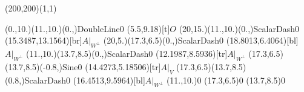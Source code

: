 \unitlength=1bp%

\begin{feynartspicture}(200,200)(1,1)

\FADiagram{}
\FAProp(0.,10.)(11.,10.)(0.,){DoubleLine}{0}
\FALabel(5.5,9.18)[t]{$O$}
\FAProp(20,15.)(11.,10.)(0.,){ScalarDash}{0}
\FALabel(15.3487,13.1564)[br]{$A|_{W^\perp}$}
\FAProp(20,5.)(17.3,6.5)(0.,){ScalarDash}{0}
\FALabel(18.8013,6.4064)[bl]{$A|_{W^\perp}$}
\FAProp(11.,10.)(13.7,8.5)(0.,){ScalarDash}{0}
\FALabel(12.1987,8.5936)[tr]{$A|_{W^\perp}$}
\FAProp(17.3,6.5)(13.7,8.5)(-0.8,){Sine}{0}
\FALabel(14.4273,5.18506)[tr]{$A|_V$}
\FAProp(17.3,6.5)(13.7,8.5)(0.8,){ScalarDash}{0}
\FALabel(16.4513,9.5964)[bl]{$A|_{W^\perp}$}
\FAVert(11.,10.){0}
\FAVert(17.3,6.5){0}
\FAVert(13.7,8.5){0}
\end{feynartspicture}

